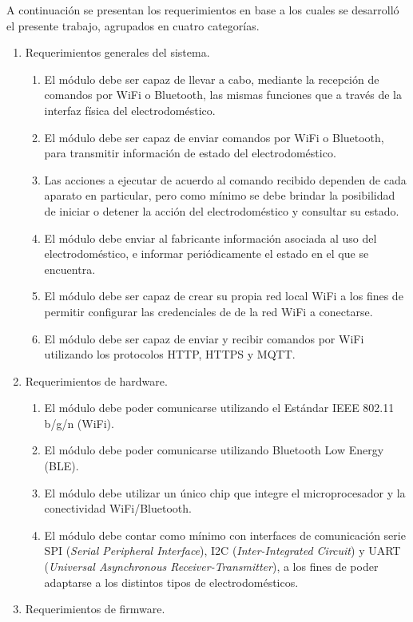 A continuación se presentan los requerimientos en base a los cuales se desarrolló el presente trabajo, agrupados en cuatro categorías.
\begin{enumerate}
	\item Requerimientos generales del sistema.
	\begin{enumerate}
		\item El módulo debe ser capaz de llevar a cabo, mediante la recepción de comandos por
WiFi o Bluetooth, las mismas funciones que a través de la interfaz física del
electrodoméstico.
		\item El módulo debe ser capaz de enviar comandos por WiFi o Bluetooth, para transmitir información de estado del electrodoméstico.
		\item Las acciones a ejecutar de acuerdo al comando recibido dependen de cada
aparato en particular, pero como mínimo se debe brindar la posibilidad de iniciar o
detener la acción del electrodoméstico y consultar su estado.
		\item El módulo debe enviar al fabricante información asociada al uso del
electrodoméstico, e informar periódicamente el estado en el que se encuentra.
		\item El módulo debe ser capaz de crear su propia red local WiFi a los fines de permitir configurar las credenciales de de la red WiFi a conectarse.
		\item El módulo debe ser capaz de enviar y recibir comandos por WiFi utilizando los
protocolos HTTP, HTTPS y MQTT.
	\end{enumerate}
	\item Requerimientos de hardware.
	\begin{enumerate}
		\item El módulo debe poder comunicarse utilizando el Estándar IEEE 802.11 b/g/n
(WiFi).
		\item El módulo debe poder comunicarse utilizando Bluetooth Low Energy (BLE).
		\item El módulo debe utilizar un único chip que integre el microprocesador y la conectividad WiFi/Bluetooth.
		\item El módulo debe contar como mínimo con interfaces de comunicación serie SPI (\emph{Serial Peripheral Interface}), I2C (\emph{Inter-Integrated Circuit}) y UART (\emph{Universal Asynchronous Receiver-Transmitter}), a los fines de poder adaptarse a los distintos tipos de electrodomésticos.
	\end{enumerate}
	\item Requerimientos de firmware.

\end{enumerate}

